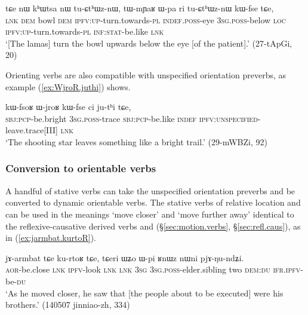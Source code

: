 \begin{exe}
\ex \label{ex:khWtsa.tuCthWznW}
\gll  tɕe nɯ kʰɯtsa nɯ tu-ɕtʰɯz-nɯ, tɯ-mɲaʁ ɯ-pa ri tu-ɕtʰɯz-nɯ kɯ-fse tɕe, \\
\textsc{lnk} \textsc{dem} bowl \textsc{dem} \textsc{ipfv}:\textsc{up}-turn.towards-\textsc{pl} \textsc{indef}.\textsc{poss}-eye \textsc{3sg}.\textsc{poss}-below \textsc{loc}  \textsc{ipfv}:\textsc{up}-turn.towards-\textsc{pl} \textsc{inf}:\textsc{stat}-be.like \textsc{lnk} \\
 \glt `[The lamas] turn the bowl upwards below the eye [of the patient].' (27-tApGi, 20)
\end{exe}

Orienting verbs are also compatible with unspecified orientation preverbs, as example (\ref{ex:WjroR.juthi}) shows.

\begin{exe}
\ex \label{ex:WjroR.juthi}
\gll   kɯ-fsoʁ ɯ-jroʁ kɯ-fse ci ju-tʰi tɕe, \\
\textsc{sbj}:\textsc{pcp}-be.bright \textsc{3sg}.\textsc{poss}-trace \textsc{sbj}:\textsc{pcp}-be.like \textsc{indef} \textsc{ipfv}:\textsc{unspecified}-leave.trace[III] \textsc{lnk} \\
\glt `The shooting star leaves something like a bright trail.' (29-mWBZi, 92)
  \end{exe}
  
\subsubsection{Conversion to orientable verbs} \label{sec:convertion.orientable.verbs}
A handful of stative verbs can take the unspecified orientation preverbs and be converted to dynamic orientable verbs. The stative verbs of relative location  and   can be used in the meanings `move closer' and `move further away' identical to the reflexive-causative derived verbs  and (§\ref{sec:motion.verbs}, §\ref{sec:refl.caus}), as in (\ref{ex:jarmbat.kurtoR}).

\begin{exe}
\ex \label{ex:jarmbat.kurtoR}
\gll  jɤ-armbat tɕe ku-rtoʁ tɕe, tɕeri ɯʑo ɯ-pi ʁnɯz nɯni pjɤ-ŋu-ndʑi. \\
\textsc{aor}-be.close \textsc{lnk} \textsc{ipfv}-look \textsc{lnk} \textsc{lnk} \textsc{3sg} \textsc{3sg}.\textsc{poss}-elder.sibling two \textsc{dem}:\textsc{du} \textsc{ifr}.\textsc{ipfv}-be-\textsc{du} \\
\glt `As he moved closer, he saw that [the people about to be executed] were his brothers.' (140507 jinniao-zh, 334)
\end{exe}

